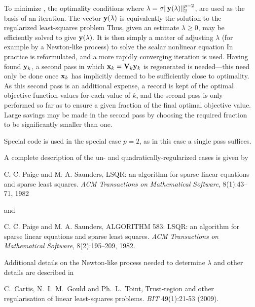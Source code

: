 \documentclass{galahad}
\begin{document}
To minimize , the optimality conditions
where $\lambda = \sigma \|{\mathbf{y}}(\lambda)\|_2^{p-2}$,
are used as the basis of an iteration.
The vector ${\mathbf{y}}(\lambda)$ is equivalently the solution to the
regularized least-squares problem
Thus, given an estimate $\lambda \geq 0$,  may be efficiently
solved to give ${\mathbf{y}}(\lambda)$.
It is then simply a matter of adjusting $\lambda$
(for example by a Newton-like process) to solve the scalar nonlinear equation
In practice  is reformulated, and a more rapidly converging iteration is
used. Having found  ${\mathbf{y}}_k$, a second pass in which
${\mathbf{x}}_k = {\mathbf{V}}_k {\mathbf{y}}_k$ is regenerated is needed---this need only be done
once ${\mathbf{x}}_k$ has implicitly deemed to be sufficiently close to optimality.
As this second pass is an additional expense, a record is kept of the
optimal objective function values for each value of $k$, and the second
pass is only performed so far as to ensure a given fraction of the
final optimal objective value. Large savings may be made in the second
pass by choosing the required fraction to be significantly smaller than one.

Special code is used in the special case $p=2$, as in this case a single
pass suffices.

\galreferences
A complete description of the un- and quadratically-regularized
cases is given by
\vspace*{1mm}

\noindent
C. C. Paige and M. A. Saunders,
LSQR: an algorithm for sparse linear equations and sparse least  squares.
{\em ACM Transactions on Mathematical Software}, 8(1):43--71, 1982

\noindent
and

\noindent
C. C. Paige and M. A. Saunders,
ALGORITHM 583: LSQR: an algorithm for sparse linear equations and
  sparse least squares.
{\em ACM Transactions on Mathematical Software}, 8(2):195--209, 1982.

\noindent
Additional details on the Newton-like process needed to determine $\lambda$ and
other details are described in
\vspace*{1mm}

\noindent
C.\ Cartis, N.\ I.\ M.\ Gould and Ph.\ L.\ Toint,
Trust-region and other regularisation of linear
least-squares problems.
{\em BIT} 49(1):21-53 (2009).
\end{document}
